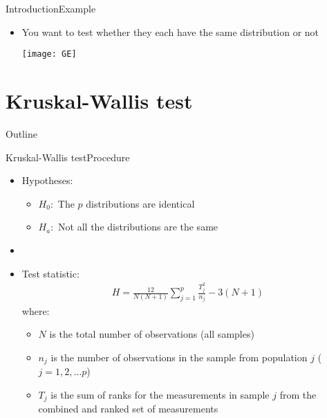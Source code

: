 \documentclass[xcolor=dvipsnames]{beamer}
\begin{document}
\begin{frame}{Introduction}{Example}
	\begin{itemize}
		\item You want to test whether they each have the same distribution or not
		\begin{center}
			\texttt{[image: GE]}
		\end{center}
	\end{itemize}
\end{frame}

\section{Kruskal-Wallis test}

\begin{frame}{Outline}
	\tableofcontents[currentsection,subsectionstyle=show/shaded/hide]
\end{frame}

\begin{frame}{Kruskal-Wallis test}{Procedure}
	\begin{itemize}
		\item Hypotheses:
		\begin{itemize}
			\item $H_0:$ The $p$ distributions are identical
			\item $H_a:$ Not all the distributions are the same
		\end{itemize}
		\item[]
		\item Test statistic:
		\begin{gather*}
		H = \frac{12}{N (N+1)} \sum_{j=1}^p \frac{T_j^2}{n_j} - 3(N + 1)
		\end{gather*}
		where: 
		\begin{itemize}
			\item $N$ is the total number of observations (all samples)
			\item $n_j$ is the number of observations in the sample from population $j$ ($j = 1, 2, \hdots p$)
			\item $T_j$ is the sum of ranks for the measurements in sample $j$ from the combined and ranked set of measurements
		\end{itemize}
	\end{itemize}
\end{frame}
\end{document}
